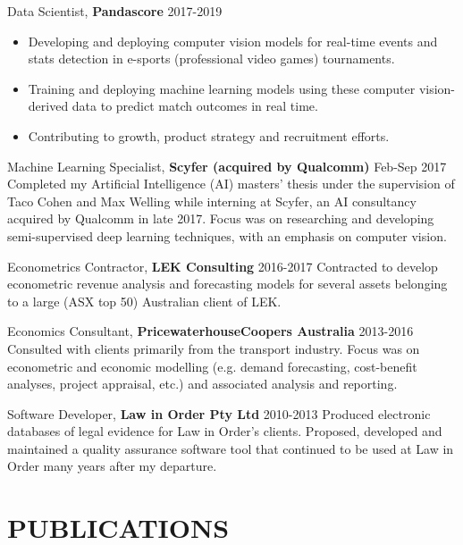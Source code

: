 \documentclass[margin]{res}
\begin{document}
\begin{resume}
		{Data Scientist,} {\bf Pandascore} \hfill 2017-2019
		\vspace{1mm}
		\begin{itemize}
			\item Developing and deploying computer vision models for real-time events and stats detection in e-sports (professional video games) tournaments.
			\item Training and deploying machine learning models using these computer vision-derived data to predict match outcomes in real time.
			\item Contributing to growth, product strategy and recruitment efforts.
		\end{itemize}
		
		{Machine Learning Specialist,} {\bf Scyfer (acquired by Qualcomm)} \hfill Feb-Sep 2017\vspace{1mm}\newline
		Completed my Artificial Intelligence (AI) masters' thesis under the supervision of Taco Cohen and Max Welling while interning at Scyfer, an AI consultancy acquired by Qualcomm in late 2017. Focus was on researching and developing semi-supervised deep learning techniques, with an emphasis on computer vision.
		
		{Econometrics Contractor,} {\bf LEK Consulting} \hfill 2016-2017\vspace{1mm}\newline
		Contracted to develop econometric revenue analysis and forecasting models for several assets belonging to a large (ASX top 50) Australian client of LEK.
		
		{Economics Consultant,} {\bf PricewaterhouseCoopers Australia} \hfill 2013-2016\vspace{1mm}\newline
		Consulted with clients primarily from the transport industry. Focus was on econometric and economic modelling (e.g. demand forecasting, cost-benefit analyses, project appraisal, etc.) and associated analysis and reporting.
		
		{Software Developer,} {\bf Law in Order Pty Ltd} \hfill 2010-2013\vspace{1mm}\newline
		Produced electronic databases of legal evidence for Law in Order's clients. Proposed, developed and maintained a quality assurance software tool that continued to be used at Law in Order many years after my departure.
		
		
		
		\section{PUBLICATIONS}
		

\end{resume}
\end{document}
